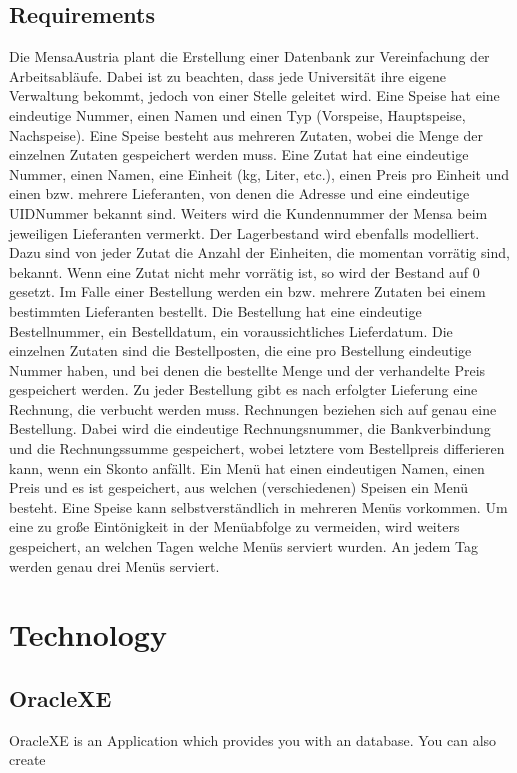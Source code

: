 \documentclass[11pt,a4paper]{article}
\begin{document}
\subsection{Requirements}
Die MensaAustria plant die Erstellung einer Datenbank zur Vereinfachung der Arbeitsabläufe. Dabei
ist zu beachten, dass jede Universität ihre eigene Verwaltung bekommt, jedoch von einer Stelle
geleitet wird.
Eine Speise hat eine eindeutige Nummer, einen Namen und einen Typ (Vorspeise, Hauptspeise,
Nachspeise). Eine Speise besteht aus mehreren Zutaten, wobei die Menge der einzelnen Zutaten
gespeichert werden muss.
Eine Zutat hat eine eindeutige Nummer, einen Namen, eine Einheit (kg, Liter, etc.), einen Preis pro
Einheit und einen bzw. mehrere Lieferanten, von denen die Adresse und eine eindeutige
UIDNummer bekannt sind. Weiters wird die Kundennummer der Mensa beim jeweiligen Lieferanten
vermerkt. Der Lagerbestand wird ebenfalls modelliert. Dazu sind von jeder Zutat die Anzahl der
Einheiten, die momentan vorrätig sind, bekannt. Wenn eine Zutat nicht mehr vorrätig ist, so wird der
Bestand auf 0 gesetzt.
Im Falle einer Bestellung werden ein bzw. mehrere Zutaten bei einem bestimmten Lieferanten
bestellt. Die Bestellung hat eine eindeutige Bestellnummer, ein Bestelldatum, ein voraussichtliches
Lieferdatum. Die einzelnen Zutaten sind die Bestellposten, die eine pro Bestellung eindeutige
Nummer haben, und bei denen die bestellte Menge und der verhandelte Preis gespeichert werden.
Zu jeder Bestellung gibt es nach erfolgter Lieferung eine Rechnung, die verbucht werden muss.
Rechnungen beziehen sich auf genau eine Bestellung. Dabei wird die eindeutige Rechnungsnummer,
die Bankverbindung und die Rechnungssumme gespeichert, wobei letztere vom Bestellpreis
differieren kann, wenn ein Skonto anfällt.
Ein Menü hat einen eindeutigen Namen, einen Preis und es ist gespeichert, aus welchen
(verschiedenen) Speisen ein Menü besteht. Eine Speise kann selbstverständlich in mehreren Menüs
vorkommen.
Um eine zu große Eintönigkeit in der Menüabfolge zu vermeiden, wird weiters gespeichert, an
welchen Tagen welche Menüs serviert wurden. An jedem Tag werden genau drei Menüs serviert.

\newpage
\section{Technology}
\subsection{OracleXE}
OracleXE is an Application which provides you with an database. You can also create
\end{document}
